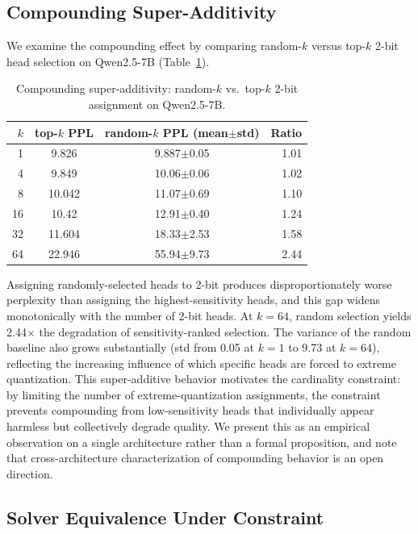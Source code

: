 \documentclass[11pt,a4paper]{article}
\begin{document}
\subsection{Compounding Super-Additivity}
\label{sec:compounding}

We examine the compounding effect by comparing random-$k$ versus top-$k$ 2-bit head selection on Qwen2.5-7B (Table~\ref{tab:compounding}).

\begin{table}[t]
\centering
\caption{Compounding super-additivity: random-$k$ vs.\ top-$k$ 2-bit assignment on Qwen2.5-7B.}
\label{tab:compounding}
\begin{tabular}{rccr}
\toprule
$k$ & top-$k$ PPL & random-$k$ PPL (mean$\pm$std) & Ratio \\
\midrule
1  & 9.826  & 9.887$\pm$0.05  & 1.01 \\
4  & 9.849  & 10.06$\pm$0.06  & 1.02 \\
8  & 10.042 & 11.07$\pm$0.69  & 1.10 \\
16 & 10.42  & 12.91$\pm$0.40  & 1.24 \\
32 & 11.604 & 18.33$\pm$2.53  & 1.58 \\
64 & 22.946 & 55.94$\pm$9.73  & 2.44 \\
\bottomrule
\end{tabular}
\end{table}

Assigning randomly-selected heads to 2-bit produces disproportionately worse perplexity than assigning the highest-sensitivity heads, and this gap widens monotonically with the number of 2-bit heads.
At $k = 64$, random selection yields 2.44$\times$ the degradation of sensitivity-ranked selection.
The variance of the random baseline also grows substantially (std from 0.05 at $k{=}1$ to 9.73 at $k{=}64$), reflecting the increasing influence of which specific heads are forced to extreme quantization.
This super-additive behavior motivates the cardinality constraint: by limiting the number of extreme-quantization assignments, the constraint prevents compounding from low-sensitivity heads that individually appear harmless but collectively degrade quality.
We present this as an empirical observation on a single architecture rather than a formal proposition, and note that cross-architecture characterization of compounding behavior is an open direction.

\subsection{Solver Equivalence Under Constraint}
\end{document}

